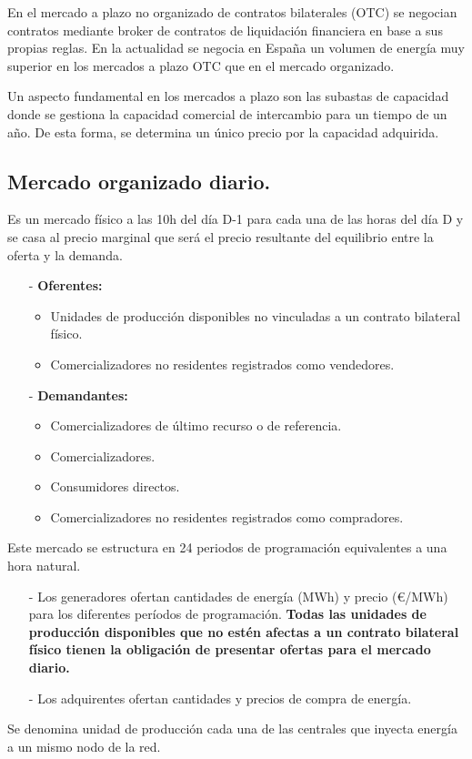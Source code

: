 En el mercado a plazo no organizado de contratos bilaterales (OTC) se negocian contratos mediante broker de contratos de liquidación financiera en base a sus propias reglas. En la actualidad se negocia en España un volumen de energía muy superior en los mercados a plazo
OTC que en el mercado organizado.



Un aspecto fundamental en los mercados a plazo son las subastas de capacidad donde se gestiona la capacidad comercial de intercambio para un tiempo de un año. De esta forma, se determina un único precio por la capacidad adquirida.
 
\subsection{Mercado organizado diario.}
Es un mercado físico a las 10h del día D-1 para cada una de las horas del día D y se casa al precio marginal que será el precio resultante del equilibrio entre la oferta y la demanda.
\begin{itemize}
	\item [-] \textbf{Oferentes:}
	\begin{itemize}
		\item Unidades de producción disponibles no vinculadas a un contrato bilateral físico.
		\item Comercializadores no residentes registrados como vendedores.
	\end{itemize}
	\item [-] \textbf{Demandantes:}
	\begin{itemize}
		\item Comercializadores de último recurso o de referencia.
		\item Comercializadores.
		\item Consumidores directos.
		\item Comercializadores no residentes registrados como compradores. 
	\end{itemize}
\end{itemize}

Este mercado se estructura en 24 periodos de programación equivalentes a una hora natural. 
\begin{itemize}
	\item [-] Los generadores ofertan cantidades de energía (MWh) y precio (€/MWh) para los diferentes
	períodos de programación. \textbf{Todas las unidades de producción disponibles que no estén afectas a un contrato bilateral físico
		tienen la obligación de presentar ofertas para el mercado diario.}
	\item [-] Los adquirentes ofertan cantidades y precios de compra de energía.
\end{itemize}
Se denomina unidad de producción cada una de las centrales que inyecta energía a un mismo nodo de la red.

